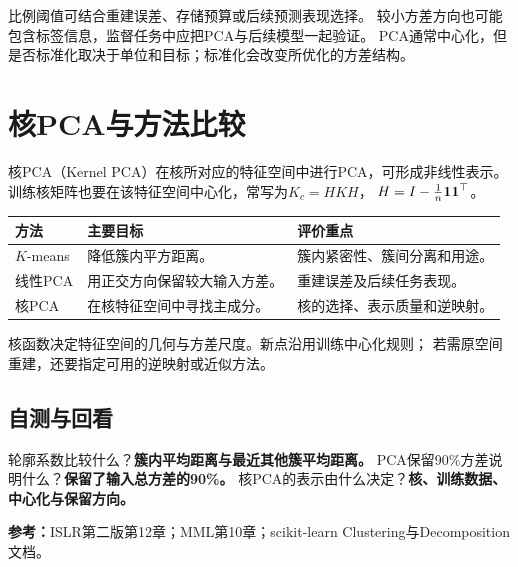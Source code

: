 比例阈值可结合重建误差、存储预算或后续预测表现选择。
较小方差方向也可能包含标签信息，监督任务中应把PCA与后续模型一起验证。
PCA通常中心化，但是否标准化取决于单位和目标；标准化会改变所优化的方差结构。


\section{核PCA与方法比较}
\label{sec:unsup-kernel-pca}
核PCA（Kernel PCA）在核所对应的特征空间中进行PCA，可形成非线性表示。
训练核矩阵也要在该特征空间中心化，常写为$K_c=HKH$，
$H=I-\frac1n\boldsymbol{1}\boldsymbol{1}^\top$。

\begin{center}
\begin{tabularx}{\textwidth}{P{29mm}P{46mm}Y}
\toprule
方法 & 主要目标 & 评价重点\\
\midrule
$K$-means & 降低簇内平方距离。 & 簇内紧密性、簇间分离和用途。\\
线性PCA & 用正交方向保留较大输入方差。 & 重建误差及后续任务表现。\\
核PCA & 在核特征空间中寻找主成分。 & 核的选择、表示质量和逆映射。\\
\bottomrule
\end{tabularx}
\end{center}

核函数决定特征空间的几何与方差尺度。新点沿用训练中心化规则；
若需原空间重建，还要指定可用的逆映射或近似方法。

\subsection{自测与回看}
轮廓系数比较什么？\textbf{簇内平均距离与最近其他簇平均距离。}
PCA保留90\%方差说明什么？\textbf{保留了输入总方差的90\%。}
核PCA的表示由什么决定？\textbf{核、训练数据、中心化与保留方向。}

\begingroup\small
\noindent\textbf{参考：}ISLR第二版第12章；MML第10章；scikit-learn Clustering与Decomposition文档。
\par\endgroup
